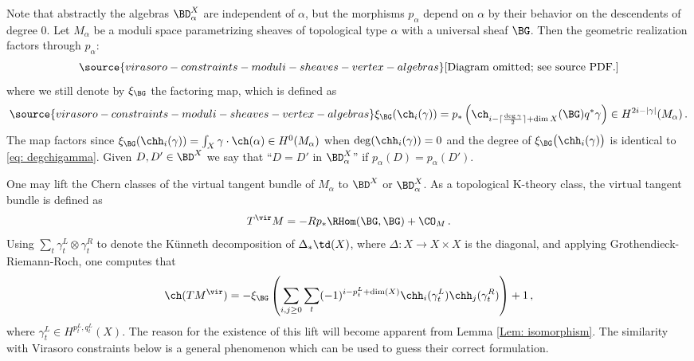 Note that abstractly the algebras $\BD^X_\alpha$ are independent of $\alpha$, but the morphisms $p_\alpha$ depend on $\alpha$ by their behavior on the descendents of degree 0. Let $M_\alpha$ be a moduli space parametrizing sheaves of topological type $\alpha$ with a universal sheaf $\BG$. Then the geometric realization factors through $p_\alpha$:
\begin{equation}
\label{Eq: descentofrealization}
\source{virasoro-constraints-moduli-sheaves-vertex-algebras}
\text{[Diagram omitted; see source PDF.]}
\end{equation}
where we still denote by $\xi_\BG$ the factoring map, which is defined as
\begin{equation}\label{eq: geometricrealizationalpha}
\source{virasoro-constraints-moduli-sheaves-vertex-algebras}
\xi_{\BG}(\ch_i(\gamma))=p_\ast\left(\ch_{i-\lceil\frac{\deg \gamma}{2}\rceil+\dim X}(\BG)q^\ast \gamma\right)\in H^{2i-|\gamma|}(M_\alpha)\,.
\end{equation}
The map factors since
$\xi_{\BG}(\chh_i(\gamma))=\int_X \gamma\cdot \ch(\alpha)\in H^0(M_\alpha)$ when $\deg(\chh_i(\gamma))=0$ and the degree of $\xi_{\BG}\big(\chh_i(\gamma)\big)$ is identical to \eqref{eq: degchigamma}. Given $D, D'\in \BD^X$ we say that ``$D=D'$ in $\BD^X_\alpha$'' if $p_\alpha(D)=p_\alpha(D')$.

\begin{example}
\notready
\label{Ex: Tvir}
   One may lift the Chern classes of the virtual tangent bundle of $M_\alpha$ to $\BD^X$ or $\BD^X_{\alpha}$. As a topological K-theory class, the virtual tangent bundle is defined as
$$
T^\vir M=-Rp_\ast\RHom(\BG, \BG) + \CO_M\,.
$$
 Using $\sum_{t}\gamma_t^L\otimes \gamma_t^R$ to denote the Künneth decomposition of $\Delta_{\ast} \td(X)$, where $\Delta\colon X\to X\times X$ is the diagonal, and applying Grothendieck-Riemann-Roch, one computes that
\begin{align*}
\ch(TM^\vir)=-\xi_\BG\left(\sum_{i,j\geq 0}\sum_t(-1)^{i-p_{t}^L+\dim(X)}\chh_i(\gamma_t^L)\chh_j(\gamma_t^R)\right)+1\,,
\end{align*}
where $\gamma_t^L\in H^{p_t^L, q_t^L}(X)$. The reason for the existence of this lift will become apparent from Lemma \ref{Lem: isomorphism}. The similarity with Virasoro constraints below is a general phenomenon which can be used to guess their correct formulation.
\end{example}



